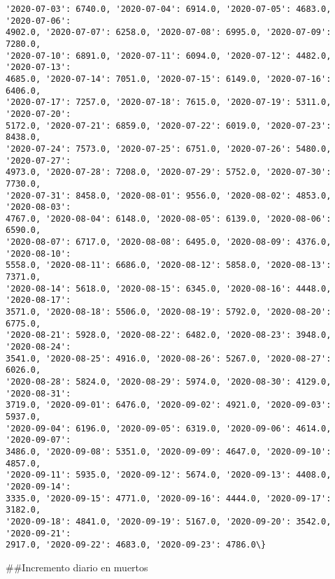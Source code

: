 \documentclass[11pt]{article}
\begin{document}
\begin{Verbatim}[commandchars=\\\{\}]
'2020-07-03': 6740.0, '2020-07-04': 6914.0, '2020-07-05': 4683.0, '2020-07-06':
4902.0, '2020-07-07': 6258.0, '2020-07-08': 6995.0, '2020-07-09': 7280.0,
'2020-07-10': 6891.0, '2020-07-11': 6094.0, '2020-07-12': 4482.0, '2020-07-13':
4685.0, '2020-07-14': 7051.0, '2020-07-15': 6149.0, '2020-07-16': 6406.0,
'2020-07-17': 7257.0, '2020-07-18': 7615.0, '2020-07-19': 5311.0, '2020-07-20':
5172.0, '2020-07-21': 6859.0, '2020-07-22': 6019.0, '2020-07-23': 8438.0,
'2020-07-24': 7573.0, '2020-07-25': 6751.0, '2020-07-26': 5480.0, '2020-07-27':
4973.0, '2020-07-28': 7208.0, '2020-07-29': 5752.0, '2020-07-30': 7730.0,
'2020-07-31': 8458.0, '2020-08-01': 9556.0, '2020-08-02': 4853.0, '2020-08-03':
4767.0, '2020-08-04': 6148.0, '2020-08-05': 6139.0, '2020-08-06': 6590.0,
'2020-08-07': 6717.0, '2020-08-08': 6495.0, '2020-08-09': 4376.0, '2020-08-10':
5558.0, '2020-08-11': 6686.0, '2020-08-12': 5858.0, '2020-08-13': 7371.0,
'2020-08-14': 5618.0, '2020-08-15': 6345.0, '2020-08-16': 4448.0, '2020-08-17':
3571.0, '2020-08-18': 5506.0, '2020-08-19': 5792.0, '2020-08-20': 6775.0,
'2020-08-21': 5928.0, '2020-08-22': 6482.0, '2020-08-23': 3948.0, '2020-08-24':
3541.0, '2020-08-25': 4916.0, '2020-08-26': 5267.0, '2020-08-27': 6026.0,
'2020-08-28': 5824.0, '2020-08-29': 5974.0, '2020-08-30': 4129.0, '2020-08-31':
3719.0, '2020-09-01': 6476.0, '2020-09-02': 4921.0, '2020-09-03': 5937.0,
'2020-09-04': 6196.0, '2020-09-05': 6319.0, '2020-09-06': 4614.0, '2020-09-07':
3486.0, '2020-09-08': 5351.0, '2020-09-09': 4647.0, '2020-09-10': 4857.0,
'2020-09-11': 5935.0, '2020-09-12': 5674.0, '2020-09-13': 4408.0, '2020-09-14':
3335.0, '2020-09-15': 4771.0, '2020-09-16': 4444.0, '2020-09-17': 3182.0,
'2020-09-18': 4841.0, '2020-09-19': 5167.0, '2020-09-20': 3542.0, '2020-09-21':
2917.0, '2020-09-22': 4683.0, '2020-09-23': 4786.0\}
    \end{Verbatim}

    \#\#Incremento diario en muertos
\end{document}
